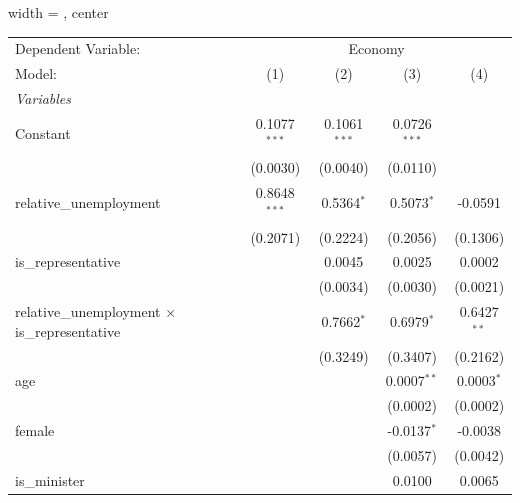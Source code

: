 
\begingroup
\centering
\begin{adjustbox}{width = \textwidth, center}
   \begin{tabular}{lcccc}
      \tabularnewline \midrule \midrule
      Dependent Variable: & \multicolumn{4}{c}{Economy}\\
      Model:                                                & (1)            & (2)            & (3)            & (4)\\  
      \midrule
      \emph{Variables}\\
      Constant                                              & 0.1077$^{***}$ & 0.1061$^{***}$ & 0.0726$^{***}$ &   \\   
                                                            & (0.0030)       & (0.0040)       & (0.0110)       &   \\   
      relative\_unemployment                                & 0.8648$^{***}$ & 0.5364$^{*}$   & 0.5073$^{*}$   & -0.0591\\   
                                                            & (0.2071)       & (0.2224)       & (0.2056)       & (0.1306)\\   
      is\_representative                                    &                & 0.0045         & 0.0025         & 0.0002\\   
                                                            &                & (0.0034)       & (0.0030)       & (0.0021)\\   
      relative\_unemployment $\times$ is\_representative    &                & 0.7662$^{*}$   & 0.6979$^{*}$   & 0.6427$^{**}$\\   
                                                            &                & (0.3249)       & (0.3407)       & (0.2162)\\   
      age                                                   &                &                & 0.0007$^{**}$  & 0.0003$^{*}$\\   
                                                            &                &                & (0.0002)       & (0.0002)\\   
      female                                                &                &                & -0.0137$^{*}$  & -0.0038\\   
                                                            &                &                & (0.0057)       & (0.0042)\\   
      is\_minister                                          &                &                & 0.0100         & 0.0065\\   

\end{tabular}
\end{adjustbox}
